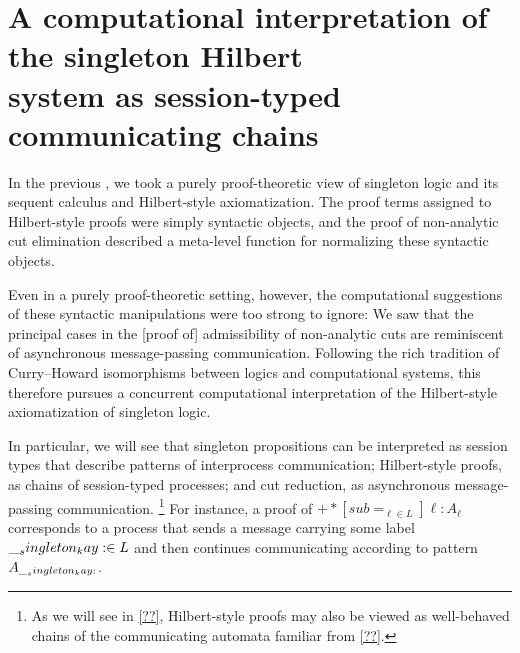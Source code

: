 \chapter{A computational interpretation of the singleton Hilbert\\system as session-typed communicating chains}\label{ch:process-chains}

In the previous , we took a purely proof-theoretic view of singleton logic and its sequent calculus and Hilbert-style axiomatization.
The proof terms assigned to Hilbert-style proofs were simply syntactic objects,
and the proof of non-analytic cut elimination described a meta-level function for normalizing these syntactic objects.

Even in a purely proof-theoretic setting, however, the computational suggestions of these syntactic manipulations were too strong to ignore:
We saw that the principal cases in the [proof of] admissibility of non-analytic cuts%
are reminiscent of asynchronous message-passing communication.
Following the rich tradition of Curry--Howard isomorphisms between logics and computational systems, this  therefore pursues a concurrent computational interpretation of the Hilbert-style axiomatization of singleton logic.

In particular, we will see that singleton propositions can be interpreted as session types that describe patterns of interprocess communication; Hilbert-style proofs, as chains of session-typed processes; and cut reduction, as asynchronous message-passing communication.%
\footnote{As we will see in \cref{??}, Hilbert-style proofs may also be viewed as well-behaved chains of the communicating automata familiar from \cref{??}.}
For instance, a proof of $\plus*[sub=_{\ell \in L}]{\ell:A_{\ell}}$ corresponds to a process that sends a message carrying some label $\__singleton_kay: \in L$ and then continues communicating according to pattern $A_{\__singleton_kay:}$.

